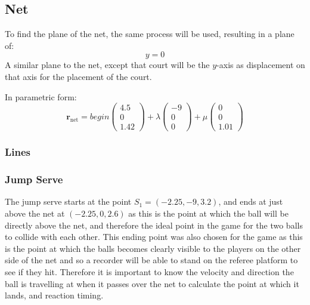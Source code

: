 \documentclass{article}
\begin{document}
	\subsection*{Net}

	To find the plane of the net, the same process will be used, resulting in a plane of: \vspace{15pt}
	\[y = 0\] \vspace{15pt}
	A similar plane to the net, except that court will be the \(y\)-axis as displacement on that axis for the placement of the court.\vspace{15pt}

	In parametric form: 
	\[\mathbf{r}_{\text{net}} = begin
		\begin{pmatrix} 4.5 \\ 0 \\ 1.42 \end{pmatrix} + 
		\lambda \begin{pmatrix} -9 \\ 0 \\ 0 \end{pmatrix} + 
		\mu \begin{pmatrix} 0 \\ 0 \\ 1.01 \end{pmatrix}\]

		\subsubsection*{Lines}

		\subsubsection*{Jump Serve}

		The jump serve starts at the point \(S_1 = (-2.25, -9, 3.2)\), and ends at just above the net at \((-2.25, 0, 2.6)\) as this is the point at which the ball will be directly above the net, and therefore the ideal point in the game for the two balls to collide with each other. This ending point was also chosen for the game as this is the point at which the balls becomes clearly visible to the players on the other side of the net and so a recorder will be able to stand on the referee platform to see if they hit. Therefore it is important to know the velocity and direction the ball is travelling at when it passes over the net to calculate the point at which it lands, and reaction timing.
		\vspace{15pt}
\end{document}
